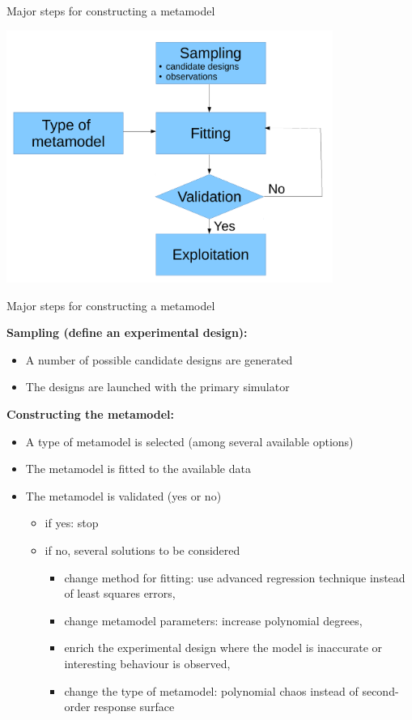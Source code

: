 \documentclass[9pt]{beamer}
\newcommand{\titx}{\usebeamercolor[fg]{subtitle}}
\begin{document}
\begin{frame}[t]{Major steps for constructing a metamodel}
 
\begin{center}
 \includegraphics[width=0.8\textwidth]{../Pics/metamodel_scheme.pdf} 
\end{center}

\end{frame}

\begin{frame}[t]{Major steps for constructing a metamodel}

{\titx \bf Sampling (define an experimental design):} 
\begin{itemize}
\item A number of possible candidate designs are generated
\item The designs are launched with the primary simulator
\end{itemize}


{\titx \bf Constructing the metamodel:}
\begin{itemize}
\item A type of metamodel is selected (among several available options)
\item The metamodel is fitted to the available data
\item The metamodel is validated (yes or no)
	\begin{itemize}
	\item if yes: stop
	\item if no, several solutions to be considered
	 \begin{itemize}
	 \item change method for fitting: use advanced regression technique instead of least squares errors,
	 \item change metamodel parameters: increase polynomial degrees,
	 \item enrich the experimental design where the model is inaccurate or interesting behaviour is observed,
	 \item change the type of metamodel: polynomial chaos instead of second-order response surface
	\end{itemize}	     
	\end{itemize}
\end{itemize}

\end{frame}
\end{document}
